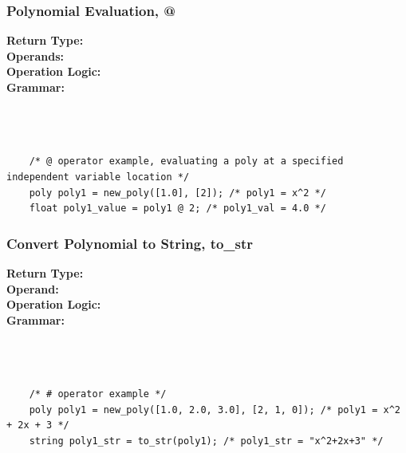 \documentclass{article}
\begin{document}
    \subsubsection{Polynomial Evaluation, @}
    \textbf{Return Type:}\\
    \textbf{Operands:}\\
    \textbf{Operation Logic:}\\
    \textbf{Grammar:}\\
    \\
    \\
    \\
    \begin{lstlisting}
    /* @ operator example, evaluating a poly at a specified independent variable location */
    poly poly1 = new_poly([1.0], [2]); /* poly1 = x^2 */
    float poly1_value = poly1 @ 2; /* poly1_val = 4.0 */
    \end{lstlisting}
    
    \subsubsection{Convert Polynomial to String, to\_str}
    \textbf{Return Type:}\\
    \textbf{Operand:}\\
    \textbf{Operation Logic:}\\
    \textbf{Grammar:}\\
    \\
    \\
    \\
    \begin{lstlisting}
    /* # operator example */
    poly poly1 = new_poly([1.0, 2.0, 3.0], [2, 1, 0]); /* poly1 = x^2 + 2x + 3 */
    string poly1_str = to_str(poly1); /* poly1_str = "x^2+2x+3" */
    \end{lstlisting}
    
\end{document}
